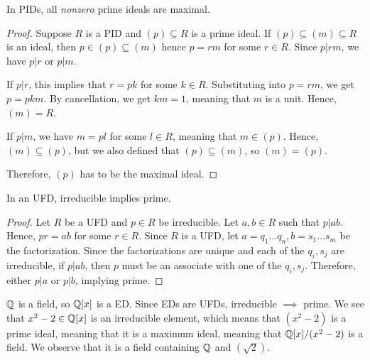 \documentclass[12pt]{article}
\begin{document}
\begin{proposition}
    In PIDs, all \textit{nonzero }prime ideals are maximal.
\end{proposition}
\begin{proof}
    Suppose $R$ is a PID and $(p)\subseteq R$ is a prime ideal. If $(p)\subseteq (m)\subseteq R$ is an ideal, then $p\in (p)\subseteq (m)$ hence $p=rm$ for some $r\in R$. Since $p|rm$, we have $p|r$ or $p|m$.

    If $p|r$, this implies that $r=pk$ for some $k\in R$. Substituting into $p=rm$, we get $p=pkm$. By cancellation, we get $km=1$, meaning that $m$ is a unit. Hence, $(m)=R$.

    If $p|m$, we have $m=pl$ for some $l\in R$, meaning that $m\in (p)$. Hence, $(m)\subseteq (p)$, but we also defined that $(p)\subseteq (m)$, so $(m)=(p)$.

    Therefore, $(p)$ has to be the maximal ideal.
\end{proof}

\begin{proposition}
    In an UFD, irreducible implies prime.
\end{proposition}
\begin{proof}
    Let $R$ be a UFD and $p\in R$ be irreducible. Let $a,b\in R$ such that $p|ab$. Hence, $pr=ab$ for some $r\in R$. Since $R$ is a UFD, let $a=q_1\dots q_n, b= s_1\dots s_m$ be the factorization. Since the factorizations are unique and each of the $q_i, s_j$ are irreducible, if $p|ab$, then $p$ must be an associate with one of the $q_i, s_j$. Therefore, either $p|a$ or $p|b$, implying prime.
\end{proof}

\eg $\mathbb{Q}$ is a field, so $\mathbb{Q}[x]$ is a ED. Since EDs are UFDs, irreducible $\implies$ prime. We see that $x^2-2\in \mathbb{Q}[x]$ is an irreducible element, which means that $(x^2-2)$ is a prime ideal, meaning that it is a maximum ideal, meaning that $\mathbb{Q}[x]/(x^2-2)$ is a field. We observe that it is a field containing $\mathbb{Q}$ and $(\sqrt{2})$.
\end{document}
